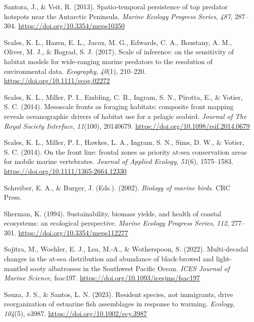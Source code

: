 \documentclass{article}
\newlength{\cslhangindent}
\newlength{\cslentryspacingunit} %
\newenvironment{CSLReferences}[2] %
 {%
  \setlength{\parindent}{0pt}
  \ifodd #1
  \let\oldpar\par
  \def\par{\hangindent=\cslhangindent\oldpar}
  \fi
  \setlength{\parskip}{#2\cslentryspacingunit}
 }%
 {}
\begin{document}
\begin{linenumbers}
\begin{CSLReferences}{1}{0}
\leavevmode{}%
Santora, J., \& Veit, R. (2013). Spatio-temporal persistence of top predator hotspots near the Antarctic Peninsula. \emph{Marine Ecology Progress Series}, \emph{487}, 287--304. \url{https://doi.org/10.3354/meps10350}

\leavevmode{}%
Scales, K. L., Hazen, E. L., Jacox, M. G., Edwards, C. A., Boustany, A. M., Oliver, M. J., \& Bograd, S. J. (2017). Scale of inference: on the sensitivity of habitat models for wide-ranging marine predators to the resolution of environmental data. \emph{Ecography}, \emph{40}(1), 210--220. \url{https://doi.org/10.1111/ecog.02272}

\leavevmode{}%
Scales, K. L., Miller, P. I., Embling, C. B., Ingram, S. N., Pirotta, E., \& Votier, S. C. (2014). Mesoscale fronts as foraging habitats: composite front mapping reveals oceanographic drivers of habitat use for a pelagic seabird. \emph{Journal of The Royal Society Interface}, \emph{11}(100), 20140679. \url{https://doi.org/10.1098/rsif.2014.0679}

\leavevmode{}%
Scales, K. L., Miller, P. I., Hawkes, L. A., Ingram, S. N., Sims, D. W., \& Votier, S. C. (2014). On the front line: frontal zones as priority at-sea conservation areas for mobile marine vertebrates. \emph{Journal of Applied Ecology}, \emph{51}(6), 1575--1583. \url{https://doi.org/10.1111/1365-2664.12330}

\leavevmode{}%
Schreiber, E. A., \& Burger, J. (Eds.). (2002). \emph{Biology of marine birds}. CRC Press.

\leavevmode{}%
Sherman, K. (1994). Sustainability, biomass yields, and health of coastal ecosystems: an ecological perspective. \emph{Marine Ecology Progress Series}, \emph{112}, 277--301. \url{https://doi.org/10.3354/meps112277}

\leavevmode{}%
Sojitra, M., Woehler, E. J., Lea, M.-A., \& Wotherspoon, S. (2022). Multi-decadal changes in the at-sea distribution and abundance of black-browed and light-mantled sooty albatrosses in the {S}outhwest {P}acific {O}cean. \emph{ICES Journal of Marine Science}, fsac197. \url{https://doi.org/10.1093/icesjms/fsac197}

\leavevmode{}%
Souza, J. S., \& Santos, L. N. (2023). Resident species, not immigrants, drive reorganization of estuarine fish assemblages in response to warming. \emph{Ecology}, \emph{104}(5), e3987. \url{https://doi.org/10.1002/ecy.3987}


\end{CSLReferences}
\end{linenumbers}
\end{document}
